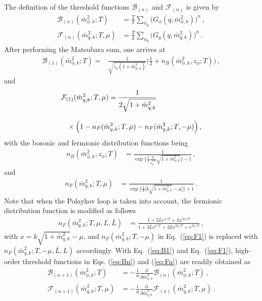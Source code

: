 \documentclass[%
reprint,
superscriptaddress,
showpacs,preprintnumbers,
 amsmath,amssymb,
 aps,
prd,
]{revtex4-1}
\def\Eq#1{Eq.~(\ref{#1})}
\begin{document}
The definition of the threshold functions $\mathcal{B}_{(n)}$ and $\mathcal{F}_{(n)}$ is given by
\begin{align}
  \mathcal{B}_{(n)}(\bar{m}^{2}_{\phi,k};T)&=\frac{T}{k}\sum_{n_q}\Big(G_{\phi}(q,\bar{m}^{2}_{\phi,k})\Big)^n\,,\label{eq:Bn} \\[2ex]
  \mathcal{F}_{(n)}(\bar{m}^{2}_{q,k};T,\mu)&=\frac{T}{k}\sum_{n_q}\Big(G_q(q,\bar{m}^{2}_{q,k})\Big)^n\,.\label{eq:Fn}
\end{align}
After performing the Matsubara sum, one arrives at
\begin{align}
    \mathcal{B}_{(1)}(\bar{m}^{2}_{\phi,k};T)=&\frac{1}{\sqrt{z_\phi(1+\bar{m}^{2}_{\phi,k})}}\bigg(\frac{1}{2}+n_{B}(\bar{m}^{2}_{\phi,k},z_\phi;T)\bigg)\,,\label{eq:B1}
\end{align}
and
\begin{align}
    &\mathcal{F}_{(1)}(\bar{m}^{2}_{q,k};T,\mu)=\frac{1}{2\sqrt{1+\bar{m}^{2}_{q,k}}}\nonumber\\[2ex]
    &\hspace{.3cm}\times\Big(1-n_{F}(\bar{m}^{2}_{q,k};T,\mu)-n_{F}(\bar{m}^{2}_{q,k};T,-\mu)\Big)\,,\label{eq:F1}
\end{align}
with the bosonic and fermionic distribution functions being
\begin{align}
  n_B(\bar{m}^{2}_{\phi,k},z_\phi;T)&=\frac{1}{\exp\bigg\{\frac{1}{T}\frac{k}{z_\phi^{1/2}}\sqrt{1+\bar{m}^{2}_{\phi,k}}\bigg\}-1}\,,
\end{align} 
and
\begin{align}
  n_F(\bar{m}^{2}_{q,k};T,\mu)&=\frac{1}{\exp\bigg\{\frac{1}{T}\Big[k\sqrt{1+\bar{m}^{2}_{q,k}}-\mu\Big]\bigg\}+1}\,.
\end{align} 
Note that when the Polaykov loop is taken into account, the fermionic distribution function is modified as follows
\begin{align}
n_F(\bar{m}^{2}_{q,k};T,\mu,L,\bar{L})&=\frac{1+2\bar{L}e^{x/T}+Le^{2x/T}}{1+3\bar{L}e^{x/T}+3Le^{2x/T}+e^{3x/T}}\,,
\end{align} 
with $x=k\sqrt{1+\bar{m}^{2}_{q,k}}-\mu$, and $n_{F}(\bar{m}^{2}_{q,k};T,-\mu)$ in \Eq{eq:F1} is replaced with $n_F(\bar{m}^{2}_{q,k};T,-\mu,\bar L, L)$ accordingly. With \Eq{eq:B1} and \Eq{eq:F1}, high-order threshold functions in Eqs. (\ref{eq:Bn}) and (\ref{eq:Fn}) are readily obtained as
\begin{align}
  \mathcal{B}_{(n+1)}(\bar{m}^{2}_{\phi,k};T)&=-\frac{1}{n}\frac{\partial}{\partial \bar{m}^{2}_{\phi,k}}\mathcal{B}_{(n)}(\bar{m}^{2}_{\phi,k};T)\,,\\[2ex]
  \mathcal{F}_{(n+1)}(\bar{m}^{2}_{q,k};T,\mu)&=-\frac{1}{n}\frac{\partial}{\partial \bar{m}^{2}_{q,k}}
                                    \mathcal{F}_{(n)}(\bar{m}^{2}_{q,k};T,\mu)\,. 
\end{align}
\end{document}
